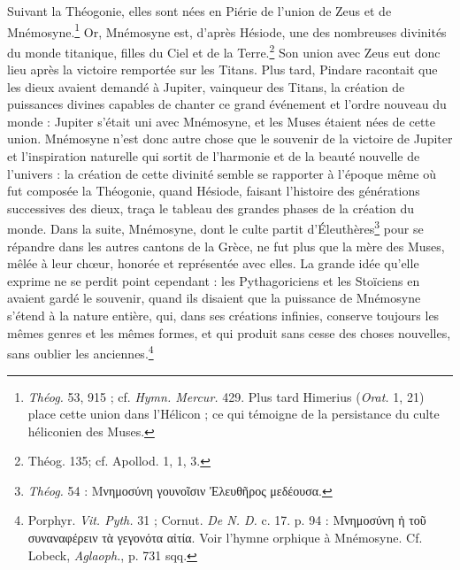 \documentclass[a4paper, 11pt, oneside, polutonikogreek, french]{article}
\begin{document}
Suivant la Théogonie, elles sont nées en Piérie de l'union de Zeus et de Mnémosyne.\footnote{\emph{Théog.} 53, 915 ; cf. \emph{Hymn. Mercur.} 429. Plus tard Himerius (\emph{Orat.} 1, 21) place cette union dans l'Hélicon ; ce qui témoigne de la persistance du culte héliconien des Muses.} Or, Mnémosyne est, d'après Hésiode, une des nombreuses divinités du monde titanique, filles du Ciel et de la Terre.\footnote{Théog. 135; cf. Apollod. 1, 1, 3.} Son union avec Zeus eut donc lieu après la victoire remportée sur les Titans. Plus tard, Pindare racontait que les dieux avaient demandé à Jupiter, vainqueur des Titans, la création de puissances divines capables de chanter ce grand événement et l'ordre nouveau du monde : Jupiter s'était uni avec Mnémosyne, et les Muses étaient nées de cette union. Mnémosyne n'est donc autre chose que le souvenir de la victoire de Jupiter et l'inspiration naturelle qui sortit de l'harmonie et de la beauté nouvelle de l'univers : la création de cette divinité semble se rapporter à l'époque même où fut composée la Théogonie, quand Hésiode, faisant l'histoire des générations successives des dieux, traça le tableau des grandes phases de la création du monde. Dans la suite, Mnémosyne, dont le culte partit d'Éleuthères\footnote{\emph{Théog.} 54 : Μνημοσύνη γουνοῖσιν Ἐλευθῆρος μεδέουσα.} pour se répandre dans les autres cantons de la Grèce, ne fut plus que la mère des Muses, mêlée à leur chœur, honorée et représentée avec elles. La grande idée qu'elle exprime ne se perdit point cependant : les Pythagoriciens et les Stoïciens en avaient gardé le souvenir, quand ils disaient que la puissance de Mnémosyne s'étend à la nature entière, qui, dans ses créations infinies, conserve toujours les mêmes genres et les mêmes formes, et qui produit sans cesse des choses nouvelles, sans oublier les anciennes.\footnote{Porphyr. \emph{Vit. Pyth.} 31 ; Cornut. \emph{De N. D.} c. 17. p. 94 : Μνημοσύνη ἠ τοῦ συναναφέρειν τὰ γεγονότα αἰτία. Voir l'hymne orphique à Mnémosyne. Cf. Lobeck, \emph{Aglaoph.}, p. 731 sqq.}
\end{document}
